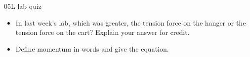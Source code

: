 \documentclass[english]{beamer}
\begin{document}
\begin{frame}{05L lab quiz}
  \begin{itemize}
    \item In last week's lab, which was greater, the tension force on the hanger or the tension force on the cart? Explain your answer for credit.
    \item Define momentum in words and give the equation.
  \end{itemize}
\end{frame}
\end{document}
